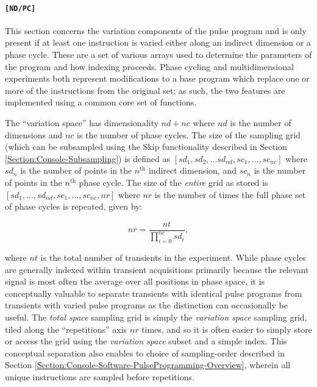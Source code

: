 \documentclass[PaulGanssle-Thesis.tex]{subfiles}
\begin{document}
\paragraph{\texttt{[ND/PC]}}
\label{Section:NDPCHeader}
This section concerns the variation components of the pulse program and is only present if at least one instruction is varied either along an indirect dimension or a phase cycle. These are a set of various arrays used to determine the parameters of the program and how indexing proceeds. Phase cycling and multidimensional experiments both represent modifications to a base program which replace one or more of the instructions from the original set; as such, the two features are implemented using a common core set of functions. 

The ``variation space'' has dimensionality $nd+nc$ where $nd$ is the number of dimensions and $nc$ is the number of phase cycles. The size of the sampling grid (which can be subsampled using the Skip functionality described in Section \ref{Section:Console-Subsampling}) is defined as $[sd_1, sd_2, ... sd_{nd}, sc_{1}, ... , sc_{nc}]$ where $sd_{n}$ is the number of points in the $n^{\mathrm{th}}$ indirect dimension, and $sc_{n}$ is the number of points in the $n^{\mathrm{th}}$ phase cycle. The size of the \textit{entire} grid as stored is $[sd_{1}, ... , sd_{nd}, sc_{1}, ..., sc_{nc}, nr]$ where $nr$ is the number of times the full phase set of phase cycles is repeated, given by:

\begin{equation*}
nr= \frac{nt}{\prod_{i=0}^{nc}sd_{i}},
\end{equation*}

where $nt$ is the total number of transients in the experiment. While phase cycles are generally indexed within transient acquisitions primarily because the relevant signal is most often the average over all positions in phase space, it is conceptually valuable to separate transients with identical pulse programs from transients with varied pulse programs as the distinction can occasionally be useful. The \textit{total space} sampling grid is simply the \textit{variation space} sampling grid, tiled along the ``repetitions'' axis $nr$ times, and so it is often easier to simply store or access the grid using the \textit{variation space} subset and a simple index. This conceptual separation also enables to choice of sampling-order described in Section \ref{Section:Console-Software-PulseProgramming-Overview}, wherein all unique instructions are sampled before repetitions.
\end{document}
